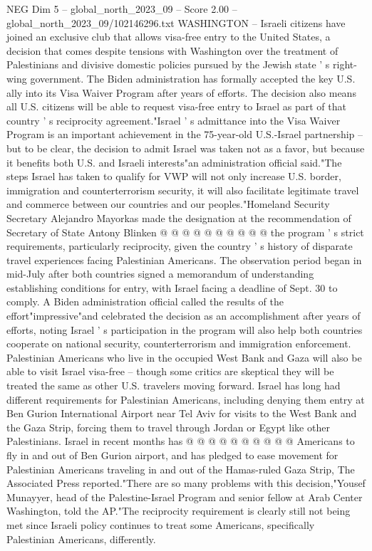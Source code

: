\begin{textsample}{NEG Dim 5 – global\_north\_2023\_09 – Score 2.00 – global\_north\_2023\_09/102146296.txt}  \label{ex:f5_neg_017}
WASHINGTON -- Israeli citizens have joined an exclusive club that allows visa-free entry to the United States, a decision that comes despite tensions with Washington over the treatment of Palestinians and divisive domestic policies pursued by the Jewish state ' s right-wing government.
The Biden administration has formally accepted the key U.S. ally into its Visa Waiver Program after years of efforts.
The decision also means all U.S. citizens will be able to request visa-free entry to Israel as part of that country ' s reciprocity agreement."Israel ' s admittance into the Visa Waiver Program is an important achievement in the 75-year-old U.S.-Israel partnership -- but to be clear, the decision to admit Israel was taken not as a favor, but because it benefits both U.S. and Israeli interests"an administration official said."The steps Israel has taken to qualify for VWP will not only increase U.S. border, immigration and counterterrorism security, it will also facilitate legitimate travel and commerce between our countries and our peoples."Homeland Security Secretary Alejandro Mayorkas made the designation at the recommendation of Secretary of State Antony Blinken @ @ @ @ @ @ @ @ @ @ the program ' s strict requirements, particularly reciprocity, given the country ' s history of disparate travel experiences facing Palestinian Americans.
The observation period began in mid-July after both countries signed a memorandum of understanding establishing conditions for entry, with Israel facing a deadline of Sept. 30 to comply.
A Biden administration official called the results of the effort"impressive"and celebrated the decision as an accomplishment after years of efforts, noting Israel ' s participation in the program will also help both countries cooperate on national security, counterterrorism and immigration enforcement.
Palestinian Americans who live in the occupied West Bank and Gaza will also be able to visit Israel visa-free -- though some critics are skeptical they will be treated the same as other U.S. travelers moving forward.
Israel has long had different requirements for Palestinian Americans, including denying them entry at Ben Gurion International Airport near Tel Aviv for visits to the West Bank and the Gaza Strip, forcing them to travel through Jordan or Egypt like other Palestinians.
Israel in recent months has @ @ @ @ @ @ @ @ @ @ Americans to fly in and out of Ben Gurion airport, and has pledged to ease movement for Palestinian Americans traveling in and out of the Hamas-ruled Gaza Strip, The Associated Press reported."There are so many problems with this decision,"Yousef Munayyer, head of the Palestine-Israel Program and senior fellow at Arab Center Washington, told the AP."The reciprocity requirement is clearly still not being met since Israeli policy continues to treat some Americans, specifically Palestinian Americans, differently.

\end{textsample}
